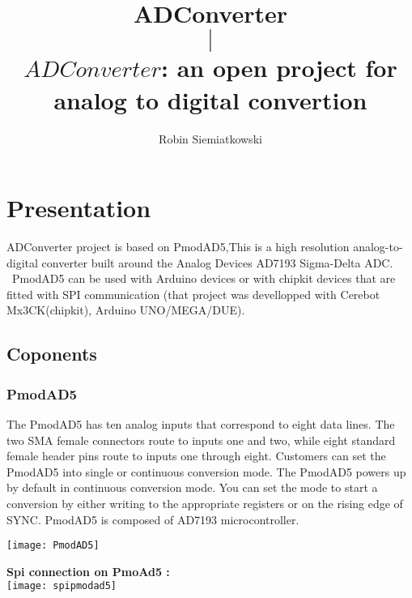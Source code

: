 \documentclass[10pt,a4paper]{report}
\title{ADConverter\\$\mid$\\$ADConverter$: an open project for\\analog to
digital convertion}
\author{Robin Siemiatkowski}
\begin{document}
\maketitle
\tableofcontents
\chapter{Presentation}
ADConverter project is based on PmodAD5,This is a high resolution analog-to-digital converter built around the Analog Devices AD7193 Sigma-Delta ADC. \ PmodAD5 can be used with Arduino devices or with chipkit devices that are fitted with SPI communication (that project was devellopped with Cerebot Mx3CK(chipkit), Arduino UNO/MEGA/DUE).
\section{Coponents}
\subsection{PmodAD5}
 
The PmodAD5 has ten analog inputs that correspond to eight data lines. The two SMA female connectors route to inputs one and two, while eight standard female header pins route to inputs one through eight.
Customers can set the PmodAD5 into single or continuous conversion mode. The PmodAD5 powers up by default in continuous conversion mode. You can set the mode to start a conversion by either writing to the appropriate registers or on the rising edge of SYNC. 
PmodAD5 is composed of AD7193 microcontroller.

\begin{center}
\texttt{[image: PmodAD5]}
\end{center}

\textbf{Spi connection on PmoAd5 :}\\	
\texttt{[image: spipmodad5]}
\end{document}
